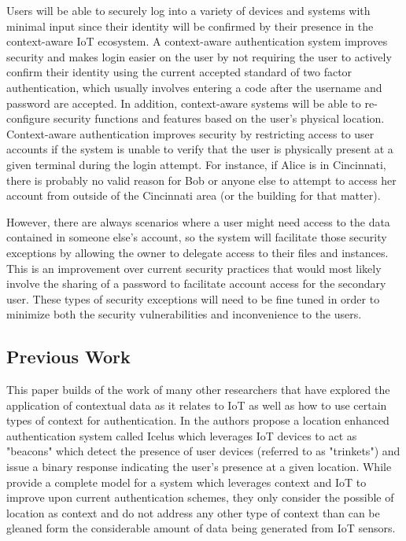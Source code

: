 \documentclass[11pt,journal]{IEEEtran}
\begin{document}
Users will be able to securely log into a variety of devices and systems with minimal input since their identity will be confirmed by their presence in the context-aware IoT ecosystem.  A context-aware authentication system improves security and makes login easier on the user by not requiring the user to actively confirm their identity using the current accepted standard of two factor authentication, which usually involves entering a code after the username and password are accepted.  In addition, context-aware systems will be able to re-configure security functions and features based on the user’s physical location.  Context-aware authentication improves security by restricting access to user accounts if the system is unable to verify that the user is physically present at a given terminal during the login attempt.  For instance, if Alice is in Cincinnati, there is probably no valid reason for Bob or anyone else to attempt to access her account from outside of the Cincinnati area (or the building for that matter). 

However, there are always scenarios where a user might need access to the data contained in someone else’s account, so the system will facilitate those security exceptions by allowing the owner to delegate access to their files and instances.  This is an improvement over current security practices that would most likely involve the sharing of a password to facilitate account access for the secondary user.  These types of security exceptions will need to be fine tuned in order to minimize both the security vulnerabilities and inconvenience to the users.

\subsection{Previous Work}
This paper builds of the work of many other researchers that have explored the application of contextual data as it relates to IoT as well as how to use certain types of context for authentication.  In \citet{Agadakos:2016:LAU:2991079.2991090} the authors propose a location enhanced authentication system called Icelus which leverages IoT devices to act as "beacons" which detect the presence of user devices (referred to as "trinkets") and issue a binary response indicating the user's presence at a given location.  While \citeauthor{Agadakos:2016:LAU:2991079.2991090} provide a complete model for a system which leverages context and IoT to improve upon current authentication schemes, they only consider the possible of location as context and do not address any other type of context than can be gleaned form the considerable amount of data being generated from IoT sensors.
\end{document}
